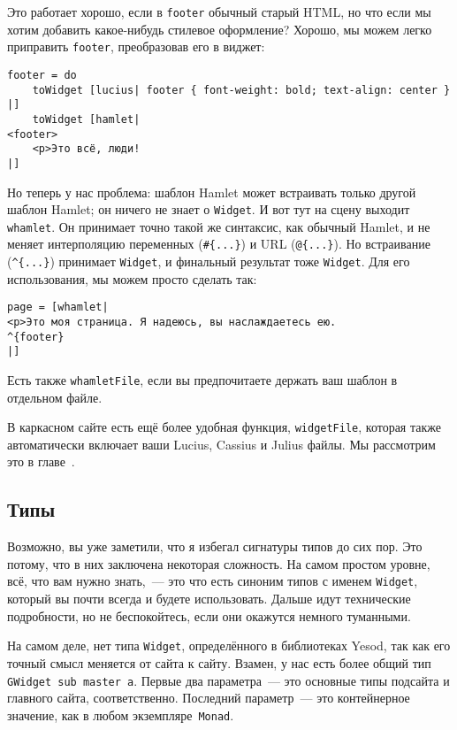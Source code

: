Это работает хорошо, если в \lstinline'footer' обычный старый HTML, но что если
мы хотим добавить какое-нибудь стилевое оформление? Хорошо, мы можем легко
приправить \lstinline'footer', преобразовав его в виджет:
\begin{lstlisting}
footer = do
    toWidget [lucius| footer { font-weight: bold; text-align: center } |]
    toWidget [hamlet|
<footer>
    <p>Это всё, люди!
|]
\end{lstlisting}

Но теперь у нас проблема: шаблон Hamlet может встраивать только другой шаблон
Hamlet; он ничего не знает о \lstinline'Widget'. И вот тут на сцену выходит
\lstinline'whamlet'. Он принимает точно такой же синтаксис, как обычный Hamlet,
и не меняет интерполяцию переменных (\lstinline'#{...}')  и URL
(\lstinline'@{...}'). Но встраивание (\lstinline'^{...}') принимает
\lstinline'Widget', и финальный результат тоже \lstinline'Widget'. Для его
использования, мы можем просто сделать так:
\begin{lstlisting}
page = [whamlet|
<p>Это моя страница. Я надеюсь, вы наслаждаетесь ею.
^{footer}
|]
\end{lstlisting}

Есть также \lstinline'whamletFile', если вы предпочитаете держать ваш шаблон в
отдельном файле.

\begin{remark}
    В каркасном сайте есть ещё более удобная функция, \lstinline'widgetFile',
    которая также автоматически включает ваши Lucius, Cassius и Julius файлы.
    Мы рассмотрим это в главе~.
\end{remark}

\subsection{Типы}
Возможно, вы уже заметили, что я избегал сигнатуры типов до сих пор. Это
потому, что в них заключена некоторая сложность. На самом простом уровне, всё,
что вам нужно знать,~--- это что есть синоним типов с именем
\lstinline'Widget', который вы почти всегда и будете использовать. Дальше идут
технические подробности, но не беспокойтесь, если они окажутся немного
туманными.

На самом деле, нет типа \lstinline'Widget', определённого в библиотеках Yesod,
так как его точный смысл меняется от сайта к сайту. Взамен, у нас есть более
общий тип \lstinline'GWidget sub master a'. Первые два параметра~--- это
основные типы подсайта и главного сайта, соответственно. Последний параметр~---
это контейнерное значение, как в любом экземпляре~\lstinline'Monad'.

